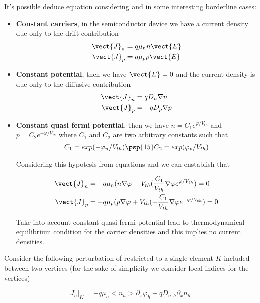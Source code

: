 It's possible deduce equation  
considering  and  in some interesting borderline cases:
\begin{itemize}
\item \textbf{Constant carriers}, in the semiconductor device we have  a current density due only to the drift contribution
\begin{align*}
\vect{J}_n & = q\mu_n n \vect{E} \\
\vect{J}_p & = q\mu_p p \vect{E}
\end{align*}
\item \textbf{Constant potential}, then we have $\vect{E}=0$ and the current density is due only to the diffusive contribution
\begin{align*}
\vect{J}_n & = qD_n\nabla n \\
\vect{J}_p & = -qD_p\nabla p
\end{align*}
\item \textbf{Constant quasi fermi potential}, then we have $n=C_1e^{\varphi / V_{th}}$ and $p=C_2e^{-\varphi / V_{th}}$ where $C_1$ and $C_2$ are two arbitrary constants such that
\begin{equation*}
C_1 = exp(-\varphi_n/V_{th}) \psp{15} C_2 = exp(\varphi_p/V_{th})
\end{equation*}

Considering this hypotesis from equations  and  we can enstablish that

\begin{align*}
\vect{J}_n & = -q\mu_n (n\nabla 	\varphi - V_{th} (\dfrac{C_1}{V_{th}}\nabla \varphi e^{\varphi / V_{th}}) = 0\\
\vect{J}_p & = -q\mu_p (p\nabla 	\varphi + V_{th} (-\dfrac{C_1}{V_{th}}\nabla \varphi e^{-\varphi / V_{th}}) = 0
\end{align*}

Take into account constant quasi fermi potential lead to thermodynamical equilibrium condition for the carrier densities and this implies no current densities.
\end{itemize}



Consider  the following perturbation of  restricted to a single element $K$ included between two vertices (for the sake of simplicity we consider local indices for the vertices)

\begin{equation}
\label{eq: j element 1d perturbata}
J_n|_K = -q\mu_n <n_h> \partial_x \varphi_h + qD_{n,h} \partial_x n_h
\end{equation}
 
